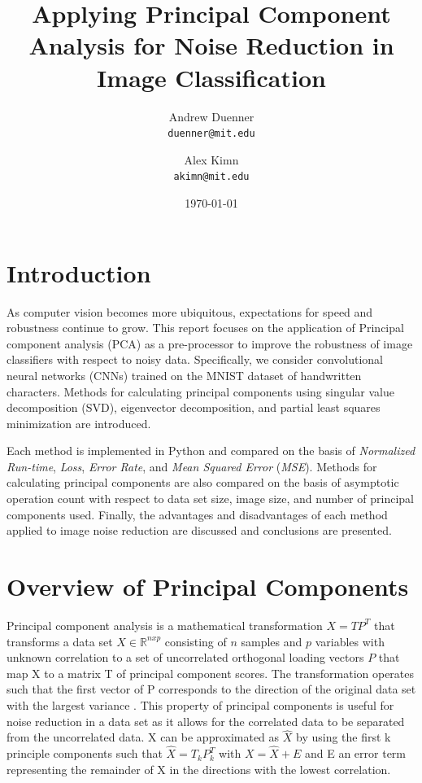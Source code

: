 \documentclass[12pt]{article}
\title{Applying Principal Component Analysis for Noise Reduction in Image Classification
}
\author{Andrew Duenner \\\texttt{duenner@mit.edu} \and Alex Kimn \\\texttt{akimn@mit.edu}}
\date{\today}
\begin{document}
\newcommand{\abs}[1]{\lvert#1\rvert}


\maketitle


\pagebreak
\tableofcontents

\pagebreak
\section{Introduction}\label{1}
As computer vision becomes more ubiquitous, expectations for speed and robustness continue to grow. This report focuses on the application of Principal component analysis (PCA) as a pre-processor to improve the robustness of image classifiers with respect to noisy data. Specifically, we consider convolutional neural networks (CNNs) trained on the MNIST dataset of handwritten characters. Methods for calculating principal components using singular value decomposition (SVD), eigenvector decomposition, and partial least squares minimization are introduced. 

Each method is implemented in Python and compared on the basis of \textit{Normalized Run-time}, \textit{Loss},  \textit{Error Rate}, and \textit{Mean Squared Error} (\textit{MSE}). Methods for calculating principal components are also compared on the basis of asymptotic operation count with respect to data set size, image size, and number of principal components used. Finally, the advantages and disadvantages of each method applied to image noise reduction are discussed and conclusions are presented.


\section{Overview of Principal Components}\label{2}
Principal component analysis is a mathematical transformation $X=TP^T$ that transforms a data set $X \in \mathbb{R}^{nxp}$ consisting of $n$ samples and $p$ variables with unknown correlation to a set of uncorrelated orthogonal loading vectors $P$  that map X to a matrix T of principal component scores. The transformation operates such that the first vector of P corresponds to the direction of the original data set with the largest variance \cite{jolliffe1986principal}. This property of principal components is useful for noise reduction in a data set as it allows for the correlated data to be separated from the uncorrelated data. X can be approximated as $\hat{X}$ by using the first k principle components such that $\hat{X}=T_kP_k^T$ with $X=\hat{X}+E$ and E an error term representing the remainder of X in the directions with the lowest correlation.
\end{document}
